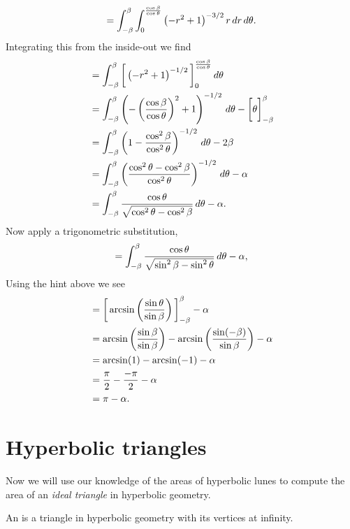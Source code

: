 \documentclass[handout,newpage,nooutcomes,hints]{ximera}
\begin{document}
\begin{problem}
\begin{freeResponse}
\[    = \int_{-\beta}^\beta \int_0^{\frac{\cos \beta}{\cos\theta}}\left(-r^2+1\right)^{-3/2} r\,d r\,d \theta.
    \]
    Integrating this from the inside-out we find
    \begin{align*}
      &= \int_{-\beta}^\beta \bigg[ \left(-r^2+1\right)^{-1/2} \bigg]_0^{\frac{\cos \beta}{\cos\theta}}\,d \theta\\
      &= \int_{-\beta}^\beta \left(-\left(\frac{\cos \beta}{\cos\theta}\right)^2+1\right)^{-1/2}\,d\theta - \bigg[ \theta \bigg]_{-\beta}^\beta\\
      &= \int_{-\beta}^\beta \left(1-\frac{\cos^2 \beta}{\cos^2\theta}\right)^{-1/2}\,d \theta -2\beta\\
      &= \int_{-\beta}^\beta \left(\frac{\cos^2\theta - \cos^2 \beta}{\cos^2\theta}\right)^{-1/2} \,d \theta-\alpha\\
      &= \int_{-\beta}^\beta \frac{\cos\theta}{\sqrt{\cos^2\theta - \cos^2 \beta}}\,d \theta - \alpha.
    \end{align*}
    Now apply a trigonometric substitution,
    \[
    = \int_{-\beta}^\beta \frac{\cos\theta}{\sqrt{\sin^2\beta - \sin^2 \theta}}\,d \theta- \alpha,
    \]
    Using the hint above we see
    \begin{align*}
      &= \bigg[ \arcsin\left(\frac{\sin\theta}{\sin\beta}\right) \bigg]_{-\beta}^\beta - \alpha\\
      &= \arcsin\left(\frac{\sin\beta}{\sin\beta}\right)- \arcsin\left(\frac{\sin(-\beta)}{\sin\beta}\right)- \alpha\\
      &= \arcsin(1)-\arcsin(-1)-\alpha\\
      &= \frac{\pi}{2}-\frac{-\pi}{2}-\alpha\\
      &= \pi-\alpha.
    \end{align*}
  \end{freeResponse}
\end{problem}


\section{Hyperbolic triangles}

Now we will use our knowledge of the areas of hyperbolic lunes to
compute the area of an \textit{ideal triangle} in hyperbolic geometry.

\begin{definition}
  An  is a triangle in hyperbolic geometry with
  its vertices at infinity.
\end{definition}
\end{document}
